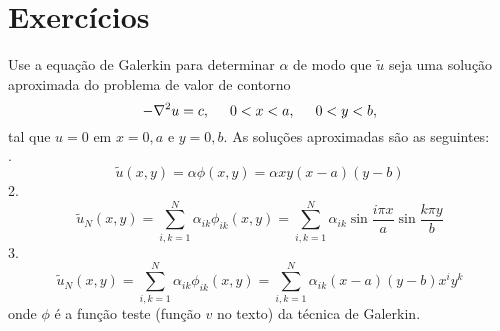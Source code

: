 \documentclass[10pt,a4paper]{article}
\begin{document}
	\section{Exercícios}
	Use a equação de Galerkin para determinar $\alpha$ de modo que $\tilde{u}$ seja uma solução aproximada do problema de valor de contorno
	\[-\nabla^2u=c, \hspace{0.5cm} 0<x<a, \hspace{0.5cm} 0<y<b,\]
	tal que $u=0$ em $x=0,a$ e $y=0,b$. As soluções aproximadas são as seguintes:\\

	. \[\tilde{u}(x,y) = \alpha\phi(x,y) = \alpha xy(x-a)(y-b)\]
	2. \[\tilde{u}_N(x,y) = \sum_{i,k=1}^N \alpha_{ik}\phi_{ik}(x,y) = \sum_{i,k=1}^N\alpha_{ik}\sin{\frac{i\pi x}{a}}\sin{\frac{k\pi y}{b}}\]
	3. \[\tilde{u}_N(x,y) = \sum_{i,k=1}^N \alpha_{ik}\phi_{ik}(x,y) = \sum_{i,k=1}^N\alpha_{ik}(x-a)(y-b)x^iy^k\]
	onde $\phi$ é a função teste (função $v$ no texto) da técnica de Galerkin.
	
\end{document}
